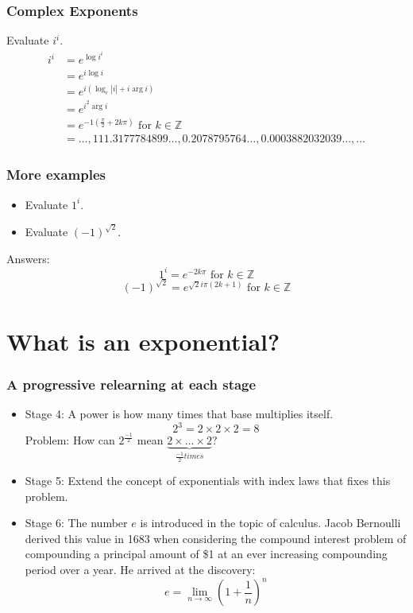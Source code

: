 \documentclass{beamer}
\begin{document}
\begin{frame}
  \frametitle{Complex Exponents}
  \begin{example}
    Evaluate $i^i$.
    \pause
    \begin{align*}
      i^i & = e^{\log i^i}\\
          & = e^{i \log i}\\
          & = e^{i (\log_e|i| + i\arg i)}\\
          & = e^{i^2 \arg i}\\
          & = e^{-1(\frac{\pi}{2} + 2k\pi)} \mbox{ for } k \in \mathbb{Z}\\
          & = \ldots, 111.3177784899\ldots, 0.2078795764\ldots, 0.0003882032039\ldots, \ldots
    \end{align*}
  \end{example}
\end{frame}

\begin{frame}
  \frametitle{More examples}
  \begin{example}
    \begin{itemize}
      \item Evaluate $1^i$.
      \item Evaluate $(-1)^{\sqrt{2}}$.
    \end{itemize}
  \end{example}
  \pause
  Answers:
  \[1^i = e^{-2k\pi} \mbox{ for } k \in \mathbb{Z}\]
  \[(-1)^{\sqrt{2}} = e^{\sqrt{2}i\pi(2k+1)} \mbox{ for } k \in \mathbb{Z}\]
\end{frame}


\section{What is an exponential?}


\begin{frame}
  \frametitle{A progressive relearning at each stage}
  \begin{itemize}
    \item<1->Stage 4: A power is how many times that base multiplies itself.\\
      \[ 2^3 = 2\times 2 \times 2 = 8\]
      \pause
      Problem: How can $2^\frac{-1}{2}$ mean $\underbrace{2 \times \ldots \times 2}_{\frac{-1}{2} times}$?

    \item<3->Stage 5: Extend the concept of exponentials with index laws that fixes this problem.
    \item<4->Stage 6: The number $e$ is introduced in the topic of calculus. Jacob Bernoulli derived this value in 1683 when considering the compound interest problem of compounding a principal amount of \$1 at an ever increasing compounding period over a year. He arrived at the discovery:
      \[ e = \lim_{n\rightarrow \infty}\left(1 + \frac{1}{n}\right)^n \]
  \end{itemize}
\end{frame}
\end{document}

